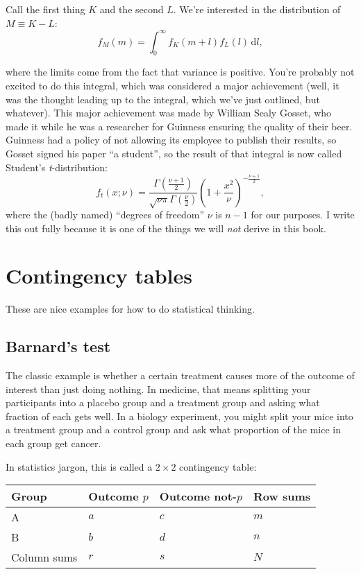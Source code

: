 \documentclass{book}
\begin{document}
Call the first thing \(K\) and the second \(L\). We're interested in the
distribution of \(M \equiv K - L\): \[
f_M(m) = \int_0^\infty f_K(m + l) f_L(l) \,\mathrm{d}l,
\]

where the limits come from the fact that variance is positive. You're
probably not excited to do this integral, which was considered a major
achievement (well, it was the thought leading up to the integral, which
we've just outlined, but whatever). This major achievement was made by
William Sealy Gosset, who made it while he was a researcher for Guinness
ensuring the quality of their beer. Guinness had a policy of not
allowing its employee to publish their results, so Gosset signed his
paper ``a student'', so the result of that integral is now called
Student's \emph{t}-distribution: \[
f_t(x; \nu) = \frac{\Gamma(\frac{\nu+1}{2})}{\sqrt{\nu\pi} \Gamma\left(\frac{\nu}{2}\right)}
  \left(1+ \frac{x^2}{\nu}\right)^{-\frac{\nu+1}{2}},
\] where the (badly named) ``degrees of freedom'' \(\nu\) is \(n-1\) for
our purposes. I write this out fully because it is one of the things we
will \emph{not} derive in this book.

\section{Contingency tables}\label{contingency-tables}

These are nice examples for how to do statistical thinking.

\subsection{Barnard's test}\label{barnards-test}

The classic example is whether a certain treatment causes more of the
outcome of interest than just doing nothing. In medicine, that means
splitting your participants into a placebo group and a treatment group
and asking what fraction of each gets well. In a biology experiment, you
might split your mice into a treatment group and a control group and ask
what proportion of the mice in each group get cancer.

In statistics jargon, this is called a \(2 \times 2\) contingency table:

\begin{longtable}[]{@{}llll@{}}
\toprule
Group & Outcome \(p\) & Outcome not-\(p\) & Row sums\tabularnewline
\midrule
\endhead
A & \(a\) & \(c\) & \(m\)\tabularnewline
B & \(b\) & \(d\) & \(n\)\tabularnewline
Column sums & \(r\) & \(s\) & \(N\)\tabularnewline
\bottomrule
\end{longtable}
\end{document}
